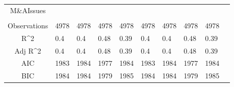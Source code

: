 \documentclass{article}
\begin{document}
\begin{table}[H]
\begin{tabular}{|clllllllll|}
  M\&AIssues &  &  &  &  &  &  &  &  & \\ 
   &  &  &  &  &  &  &  &  & \\ 
  \hline 
 Observations & 4978 & 4978 & 4978 & 4978 & 4978 & 4978 & 4978 & 4978 & \\ 
  R^2 & 0.4 & 0.4 & 0.48 & 0.39 & 0.4 & 0.4 & 0.48 & 0.39 & \\ 
  Adj R^2 & 0.4 & 0.4 & 0.48 & 0.39 & 0.4 & 0.4 & 0.48 & 0.39 & \\ 
  AIC & 1983 & 1984 & 1977 & 1984 & 1983 & 1984 & 1977 & 1984 & \\ 
  BIC & 1984 & 1984 & 1979 & 1985 & 1984 & 1984 & 1979 & 1985 & \\ 
   \hline
\end{tabular}
 
\end{table}
\end{document}
